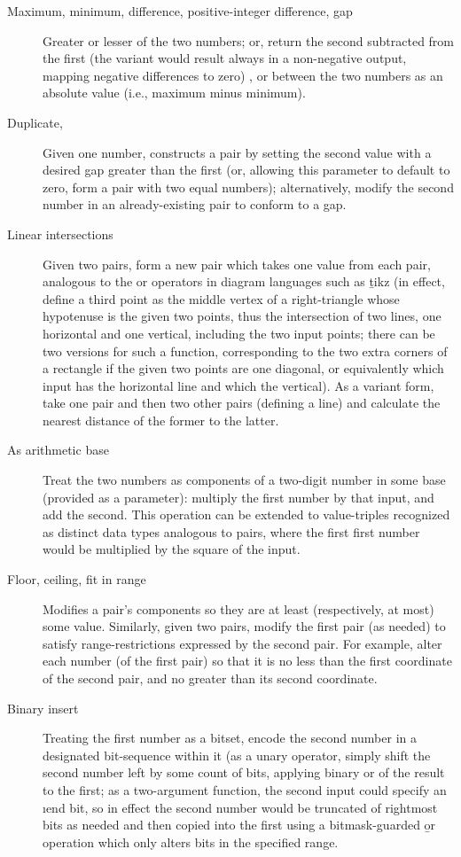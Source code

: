 {\begin{description}
\item[Maximum, minimum, difference, positive-integer
difference, gap]  Greater or lesser of the
two numbers; or, return the second subtracted from the first
(the  variant would result always in a non-negative
output, mapping negative differences to zero) ,
or  between the two numbers as an absolute value (i.e.,
maximum minus minimum).

\item[Duplicate, ]  Given one number, constructs a
pair by setting the second value with a desired gap greater
than the first (or, allowing this parameter to default to
zero, form a pair with two equal numbers); alternatively,
modify the second number in an already-existing pair to
conform to a gap.

\item[Linear intersections]  Given two pairs,
form a new pair which takes one value from each pair,
analogous to the \dashbar{} or \bardash{} operators
in diagram languages such as \b{tikz} (in effect, define a
third point as the middle vertex of a right-triangle
whose hypotenuse is the given two points, thus the
intersection of two lines, one horizontal and one vertical,
including the two input points;
there can be two versions for such a function,
corresponding to the two extra corners of a
rectangle if the given two points are one diagonal,
or equivalently which input has the horizontal
line and which the vertical).
\> As a variant form, take one pair and then two
other pairs (defining a line) and calculate the
nearest distance of the former to the latter.

\item[As arithmetic base]  Treat the two numbers
as components of a two-digit number in some base
(provided as a parameter): multiply the first
number by that input, and add the second. \> This
operation can be extended to value-triples
recognized as distinct data types analogous to pairs,
where the first first number would be multiplied
by the square of the input.

\item[Floor, ceiling, fit in range]  Modifies a pair's components
so they are at least (respectively, at most) some value.
\> Similarly, given two pairs, modify the
first pair (as needed) to satisfy range-restrictions
expressed by the second pair. \> For example, alter
each number (of the first pair) so that it is no
less than the first coordinate of the second pair,
and no greater than its second coordinate.

\item[Binary insert]  Treating the first
number as a bitset, encode the second number
in a designated bit-sequence within it
(as a unary operator, simply shift the second
number left by some count of bits, applying
binary or of the result to the first; as a
two-argument function, the second input
could specify an \i{end} bit, so in effect
the second number would be truncated of rightmost
bits as needed and then copied into the
first using a bitmask-guarded \b{or} operation
which only alters bits in the specified range.\;\<

\end{description}
}

